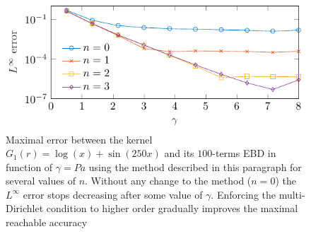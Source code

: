 \documentclass[smallextended]{svjour3}
\begin{document}
\begin{figure}[t]	
	\centering
	\includegraphics[scale = 0.8]{LinfVsGamma_arbitraryKern}
	\caption{Maximal error between the kernel $G_1(r) =  \log(x) + \sin(250x)$ and its $100$-terms EBD in function of $\gamma = Pa$ using the method described in this paragraph for several values of $n$. Without any change to the method ($n = 0$) the $L^\infty$ error stops decreasing after some value of $\gamma$. Enforcing the multi-Dirichlet condition to higher order gradually improves the maximal reachable accuracy}
	\label{figArbitraryKernel}
\end{figure}																									
																																	
\end{document}
